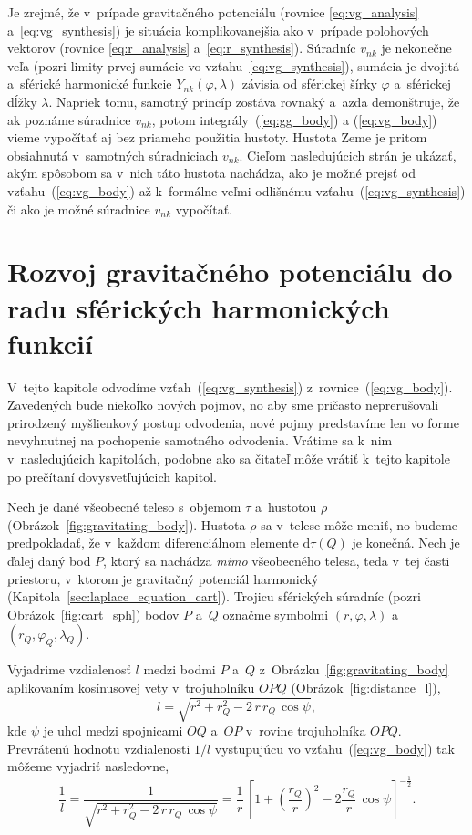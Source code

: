 \documentclass[a4paper,12pt]{book}
\newcommand{\diff}{\mathrm d}
\begin{document}
Je zrejmé, že v~prípade gravitačného potenciálu (rovnice \ref{eq:vg_analysis}
a~\ref{eq:vg_synthesis}) je situácia komplikovanejšia ako v~prípade polohových
vektorov (rovnice \ref{eq:r_analysis} a~\ref{eq:r_synthesis}).  Súradníc
$v_{nk}$ je nekonečne veľa (pozri limity prvej sumácie vo
vzťahu~\ref{eq:vg_synthesis}), sumácia je dvojitá a~sférické harmonické funkcie
$Y_{nk}(\varphi, \lambda)$ závisia od sférickej šírky $\varphi$ a~sférickej
dĺžky $\lambda$.  Napriek tomu, samotný princíp zostáva rovnaký a~azda
demonštruje, že ak poznáme súradnice $v_{nk}$, potom
integrály~(\ref{eq:gg_body}) a (\ref{eq:vg_body}) vieme vypočítať aj bez
priameho použitia hustoty.  Hustota Zeme je pritom obsiahnutá v~samotných
súradniciach $v_{nk}$.  Cieľom nasledujúcich strán je ukázať, akým spôsobom sa
v~nich táto hustota nachádza, ako je možné prejsť od vzťahu~(\ref{eq:vg_body})
až k~formálne veľmi odlišnému vzťahu~(\ref{eq:vg_synthesis}) či ako je možné
súradnice $v_{nk}$ vypočítať.



\section{Rozvoj gravitačného potenciálu do radu sférických harmonických
funkcií}
\label{sec:vg_sh_expansion}

V~tejto kapitole odvodíme vzťah~(\ref{eq:vg_synthesis})
z~rovnice~(\ref{eq:vg_body}).  Zavedených bude niekoľko nových pojmov, no aby 
sme pričasto neprerušovali prirodzený myšlienkový postup odvodenia, nové pojmy
predstavíme len vo forme nevyhnutnej na pochopenie samotného odvodenia.
Vrátime sa k~nim v~nasledujúcich kapitolách, podobne ako sa čitateľ môže vrátiť
k~tejto kapitole po prečítaní dovysvetľujúcich kapitol.

Nech je dané všeobecné teleso s~objemom $\tau$ a~hustotou $\rho$
(Obrázok~\ref{fig:gravitating_body}).  Hustota $\rho$ sa v~telese môže meniť,
no budeme predpokladať, že v~každom diferenciálnom elemente $\diff \tau(Q)$ je
konečná.  Nech je ďalej daný bod $P$, ktorý sa nachádza \emph{mimo} všeobecného
telesa, teda v~tej časti priestoru, v~ktorom je gravitačný potenciál harmonický
(Kapitola~\ref{sec:laplace_equation_cart}).  Trojicu sférických súradníc (pozri
Obrázok~\ref{fig:cart_sph}) bodov $P$ a~$Q$ označme symbolmi $(r, \varphi,
\lambda)$ a~$(r_Q, \varphi_Q, \lambda_Q)$.

Vyjadrime vzdialenosť $l$ medzi bodmi $P$ a~$Q$
z~Obrázku~\ref{fig:gravitating_body} aplikovaním kosínusovej vety
v~trojuholníku $OPQ$ (Obrázok~\ref{fig:distance_l}),
%
\begin{equation}
l = \sqrt{r^2 + r_Q^2 - 2 \, r \, r_Q \, \cos\psi}{,}
\end{equation}
%
kde $\psi$ je uhol medzi spojnicami $OQ$ a~$OP$ v~rovine trojuholníka $OPQ$.
Prevrátenú hodnotu vzdialenosti $1 \slash l$ vystupujúcu vo
vzťahu~(\ref{eq:vg_body}) tak môžeme vyjadriť nasledovne,
%
\begin{equation}
\label{eq:1l}
\frac{1}{l} = \frac{1}{\sqrt{ r^2 + r_Q^2 - 2 \, r \, r_Q \, \cos\psi
}} = \frac{1}{r} \, \left[1 + \left( \dfrac{r_Q}{r}
\right)^2 - 2 \dfrac{r_Q}{r} \, \cos\psi \right]^{-\frac{1}{2}}{.}
\end{equation}
\end{document}
